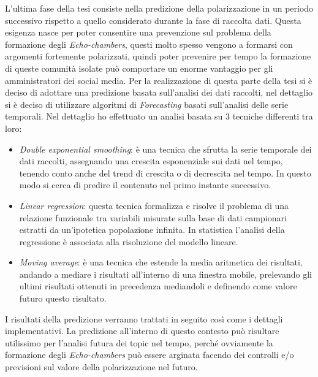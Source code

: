 L'ultima fase della tesi consiste nella predizione della polarizzazione in un periodo successivo rispetto a quello considerato durante la fase di raccolta dati. Questa esigenza nasce per poter consentire una prevenzione sul problema della formazione degli \textit{Echo-chambers}, questi molto spesso vengono a formarsi con argomenti fortemente polarizzati, quindi poter prevenire per tempo la formazione di queste comunità isolate può comportare un enorme vantaggio per gli amministratori dei social media. Per la realizzazione di questa parte della tesi si è deciso di adottare una predizione basata sull'analisi dei dati raccolti, nel dettaglio si è deciso di utilizzare algoritmi di \textit{Forecasting} basati sull'analisi delle serie temporali.
Nel dettaglio ho effettuato un analisi basata su 3 tecniche differenti tra loro:
\begin{itemize}
\item \textit{Double exponential smoothing}: è una tecnica che sfrutta la serie temporale dei dati raccolti, assegnando una crescita esponenziale sui dati nel tempo, tenendo conto anche del trend di crescita o di decrescita nel tempo. In questo modo si cerca di predire il contenuto nel primo instante successivo.
\item \textit{Linear regression}: questa tecnica formalizza e risolve il problema di una relazione funzionale tra variabili misurate sulla base di dati campionari estratti da un'ipotetica popolazione infinita. In statistica l'analisi della regressione è associata alla risoluzione del modello lineare. 
\item \textit{Moving average}: è una tecnica che estende la media aritmetica dei risultati, andando a mediare i risultati all'interno di una finestra mobile, prelevando gli ultimi risultati ottenuti in precedenza mediandoli e definendo come valore futuro questo risultato. 
\end{itemize}
I risultati della predizione verranno trattati in seguito così come i dettagli implementativi. La predizione all'interno di questo contesto può risultare utilissimo per l'analisi futura dei topic nel tempo, perché ovviamente la formazione degli \textit{Echo-chambers} può essere arginata facendo dei controlli e/o previsioni sul valore della polarizzazione nel futuro.
